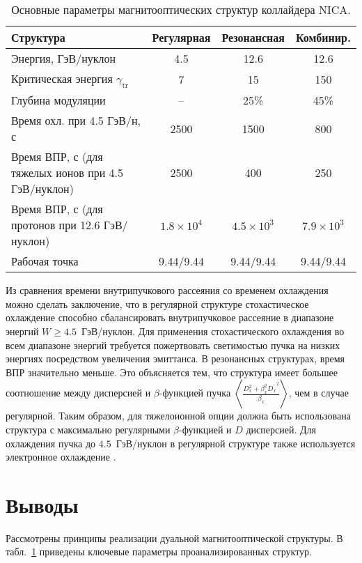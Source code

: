 \begin{table}[ht!]
	\centering
	\caption{Основные параметры магнитооптических структур коллайдера NICA.}
	\begin{tabular}{|l|c|c|c|}
		\hline
		\textbf{Структура} & \textbf{Регулярная} & \textbf{Резонансная} & \textbf{Комбинир.} \\
		\hline
		Энергия, ГэВ/нуклон & 4.5 & 12.6 & 12.6 \\
		\hline
		Критическая энергия $\gamma_{\text{tr}}$ & 7 & 15 & 150 \\
		\hline
		Глубина модуляции & -- & 25\% & 45\% \\
		\hline
		Время охл. при 4.5 ГэВ/н, с & 2500 & 1500 & 800 \\
		\hline
		\parbox{7cm}{Время ВПР, с (для тяжелых ионов при 4.5 ГэВ/нуклон)} & 2500 & 400 & 250 \\
		\hline
		\parbox{7cm}{Время ВПР, с (для протонов при 12.6 ГэВ/нуклон)} & $1.8 \times 10^4$ & $4.5 \times 10^3$ & $7.9 \times 10^3$ \\
		\hline
		Рабочая точка & 9.44/9.44 & 9.44/9.44 & 9.44/9.44 \\
		\hline
	\end{tabular}
	\label{tab:dual}
\end{table}

\noindent Из сравнения времени внутрипучкового рассеяния со временем охлаждения можно сделать заключение, что в регулярной структуре стохастическое охлаждение способно сбалансировать внутрипучковое рассеяние в диапазоне энергий $W\geq4.5$~ГэВ/нуклон. Для применения стохастического охлаждения во всем диапазоне энергий требуется пожертвовать светимостью пучка на низких энергиях посредством увеличения эмиттанса. В резонансных структурах, время ВПР значительно меньше. Это объясняется тем, что структура имеет большее соотношение между дисперсией и $\beta$-функцией пучка $\left\langle\frac{D_x^2+\beta_x^2{D_x^\prime}^2}{\beta_x}\right\rangle$, чем в случае регулярной. Таким образом, для тяжелоионной опции должна быть использована структура с максимально регулярными $\beta$-функцией и $D$ дисперсией. Для охлаждения пучка до $4.5$~ГэВ/нуклон в регулярной структуре также используется электронное охлаждение \cite{kostromin:stochastic}.

\section*{Выводы}
\par Рассмотрены принципы реализации дуальной магнитооптической структуры. 
В табл.~\ref{tab:dual} приведены ключевые параметры проанализированных структур.

